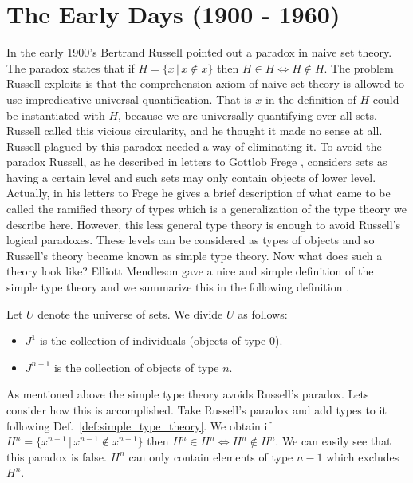 \section{The Early Days  (1900 - 1960)}
\label{sec:the_early_days_of_type_theory}

In the early 1900's Bertrand Russell pointed out a paradox in naive
set theory.  The paradox states that if $H = \{ x\,|\,x \not \in x \}$
then $H \in H \iff H \not \in H$.  The problem Russell exploits is
that the comprehension axiom of naive set theory is allowed to use
impredicative-universal quantification. That is $x$ in the definition
of $H$ could be instantiated with $H$, because we are universally
quantifying over all sets.  Russell called this vicious circularity,
and he thought it made no sense at all. Russell plagued by this
paradox needed a way of eliminating it.  To avoid the paradox Russell,
as he described in letters to Gottlob Frege \cite{Hintikka:1995,
  Heijenoort:1967}, considers sets as having a certain level and such
sets may only contain objects of lower level.  Actually, in his
letters to Frege he gives a brief description of what came to be
called the ramified theory of types which is a generalization of the
type theory we describe here.  However, this less general type theory
is enough to avoid Russell's logical paradoxes.  These levels can be
considered as types of objects and so Russell's theory became known as
simple type theory.  Now what does such a theory look like?  Elliott
Mendleson gave a nice and simple definition of the simple type theory
and we summarize this in the following definition
\cite{Mendelson:2009}.
\begin{definition}
  \label{def:simple_type_theory}
  Let $U$ denote the universe of sets. We divide $U$ as follows:
  \begin{itemize}
  \item $J^1$ is the collection of individuals (objects of type $0$).
  \item $J^{n+1}$ is the collection of objects of type $n$.
  \end{itemize}
\end{definition}
As mentioned above the simple type theory avoids Russell's paradox.
Lets consider how this is accomplished.  Take Russell's paradox
and add types to it following Def.~\ref{def:simple_type_theory}.  We
obtain if $H^n = \{ x^{n-1}\,|\,x^{n-1} \not \in x^{n-1} \}$ then $H^n
\in H^n \iff H^n \not \in H^n$.  We can easily see that this paradox is
false.  $H^n$ can only contain elements of type $n-1$ which excludes
$H^n$.

